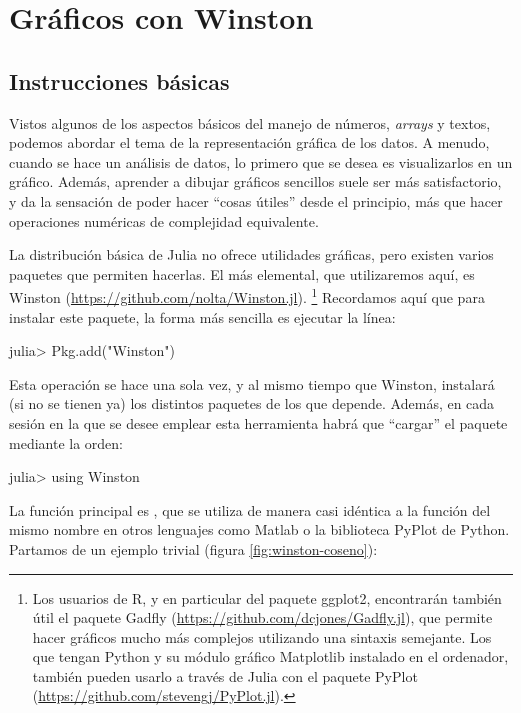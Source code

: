 \chapter{Gráficos con Winston}

\section{Instrucciones básicas}

Vistos algunos de los aspectos básicos del manejo de números, \emph{arrays} y textos, podemos abordar el tema de la representación gráfica de los datos. A menudo, cuando se hace un análisis de datos, lo primero que se desea es visualizarlos en un gráfico. Además, aprender a dibujar gráficos sencillos suele ser más satisfactorio, y da la sensación de poder hacer ``cosas útiles'' desde el principio, más que hacer operaciones numéricas de complejidad equivalente.

La distribución básica de Julia no ofrece utilidades gráficas, pero existen varios paquetes que permiten hacerlas. El más elemental, que utilizaremos aquí, es Winston (\url{https://github.com/nolta/Winston.jl}).%
\footnote{%
Los usuarios de R, y en particular del paquete ggplot2, encontrarán también útil el paquete Gadfly (\url{https://github.com/dcjones/Gadfly.jl}), que permite hacer gráficos mucho más complejos utilizando una sintaxis semejante. Los que tengan Python y su módulo gráfico Matplotlib instalado en el ordenador, también pueden usarlo a través de Julia con el paquete PyPlot (\url{https://github.com/stevengj/PyPlot.jl}).%
}
Recordamos aquí que para instalar este paquete, la forma más sencilla es ejecutar la línea:

\begin{jlconcode}
julia> Pkg.add("Winston")
\end{jlconcode}

Esta operación se hace una sola vez, y al mismo tiempo que Winston, instalará (si no se tienen ya) los distintos paquetes de los que depende. Además, en cada sesión en la que se desee emplear esta herramienta habrá que ``cargar'' el paquete mediante la orden:

\begin{jlconcode}
julia> using Winston
\end{jlconcode}

La función principal es , que se utiliza de manera casi idéntica a la función del mismo nombre en otros lenguajes como Matlab o la biblioteca PyPlot de Python. Partamos de un ejemplo trivial (figura \ref{fig:winston-coseno}):

